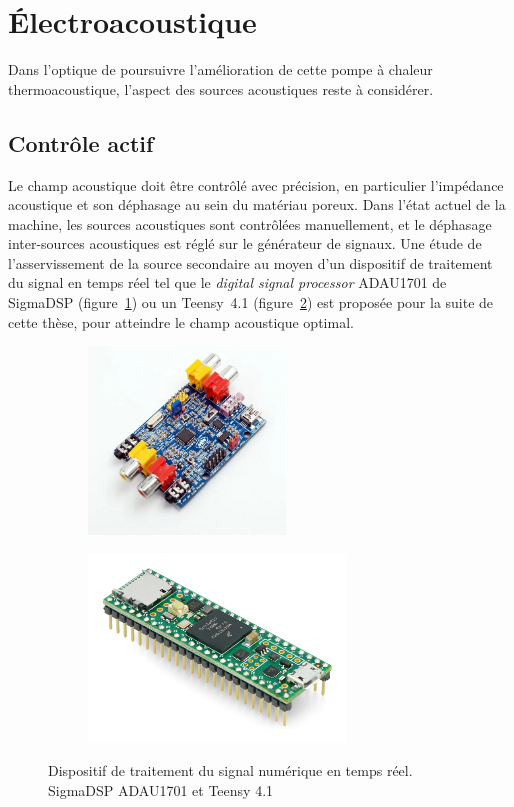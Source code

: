 \section{\'Electroacoustique}

Dans l'optique de poursuivre l'amélioration de cette pompe à chaleur thermoacoustique, l'aspect des sources acoustiques reste à considérer.

\subsection{Contrôle actif}
Le champ acoustique doit être contrôlé avec précision, en particulier l'impédance acoustique et son déphasage au sein du matériau poreux. Dans l'état actuel de la machine, les sources acoustiques sont contrôlées manuellement, et le déphasage inter-sources acoustiques est réglé sur le générateur de signaux. Une étude de l'asservissement de la source secondaire au moyen d'un dispositif de traitement du signal en temps réel tel que le \textit{digital signal processor} ADAU1701 de SigmaDSP (figure~\ref{fig:ActiveControl_ADAU1701}) ou un Teensy~4.1 (figure~\ref{fig:ActiveControl_Teensy41}) est proposée pour la suite de cette thèse, pour atteindre le champ acoustique optimal.



\begin{figure}[!ht]
    \centering
	\begin{subfigure}{.47\textwidth}
		\centering
		\includegraphics[height=5cm]{../fig/fig_ActiveControl/ADAU1701}
		\caption{}
		\label{fig:ActiveControl_ADAU1701}
	\end{subfigure}		
	\begin{subfigure}{.47\textwidth}
		\centering
		\includegraphics[height=5cm]{../fig/fig_ActiveControl/Teensy41}
		\caption{}
		\label{fig:ActiveControl_Teensy41}
	\end{subfigure}	    
    \caption{Dispositif de traitement du signal numérique en temps réel.  SigmaDSP ADAU1701 et  Teensy 4.1}
    \label{fig:•}
\end{figure}

